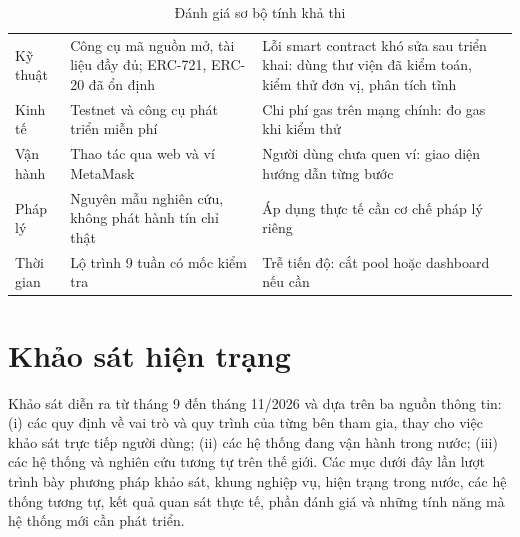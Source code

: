 \begin{table}[!htbp]
    \centering
    \caption{Đánh giá sơ bộ tính khả thi}
    \label{tab:ks-khathi}
    \small
    \begin{tabularx}{\textwidth}{|L{2.2cm}|Y|Y|}
        \hline
         &  &  \\
        \hline
        Kỹ thuật & Công cụ mã nguồn mở, tài liệu đầy đủ; ERC-721, ERC-20 đã ổn định & Lỗi smart contract khó sửa sau triển khai: dùng thư viện đã kiểm toán, kiểm thử đơn vị, phân tích tĩnh \\
        \hline
        Kinh tế & Testnet và công cụ phát triển miễn phí & Chi phí gas trên mạng chính: đo gas khi kiểm thử \\
        \hline
        Vận hành & Thao tác qua web và ví MetaMask & Người dùng chưa quen ví: giao diện hướng dẫn từng bước \\
        \hline
        Pháp lý & Nguyên mẫu nghiên cứu, không phát hành tín chỉ thật & Áp dụng thực tế cần cơ chế pháp lý riêng \\
        \hline
        Thời gian & Lộ trình 9 tuần có mốc kiểm tra & Trễ tiến độ: cắt pool hoặc dashboard nếu cần \\
        \hline
    \end{tabularx}
\end{table}

\section{Khảo sát hiện trạng}
\label{sec:khaosatsobo}
\label{sec:khaosat-hientrang}

Khảo sát diễn ra từ tháng 9 đến tháng 11/2026 và dựa trên ba nguồn thông tin: (i) các quy định về vai trò và quy trình của từng bên tham gia, thay cho việc khảo sát trực tiếp người dùng; (ii) các hệ thống đang vận hành trong nước; (iii) các hệ thống và nghiên cứu tương tự trên thế giới. Các mục dưới đây lần lượt trình bày phương pháp khảo sát, khung nghiệp vụ, hiện trạng trong nước, các hệ thống tương tự, kết quả quan sát thực tế, phần đánh giá và những tính năng mà hệ thống mới cần phát triển.

